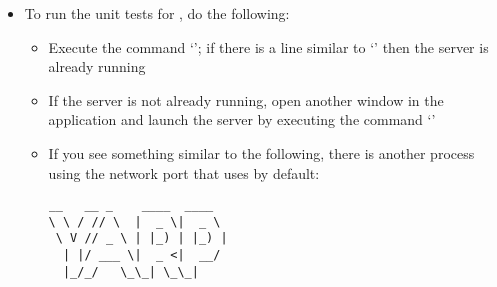 \begin{itemize}
\item\exSp{}To run the unit tests for \mplusm, do the following:
\begin{itemize}
\item Execute the command `'; if there is a line
similar to `' then the \yarp{}
server is already running
\item\exSp{}If the \yarp{} server is not already running, open another window in the
 application and launch the \yarp{} server by executing the command
`'
\item\exSp{}If you see something similar to the following, there is another process using
the network port that \yarp{} uses by default:
\outputBegin
\begin{verbatim}
__   __ _    ____  ____  
\ \ / // \  |  _ \|  _ \ 
 \ V // _ \ | |_) | |_) |
  | |/ ___ \|  _ <|  __/ 
  |_/_/   \_\_| \_\_|    


\end{verbatim}
\end{itemize}
\end{itemize}
